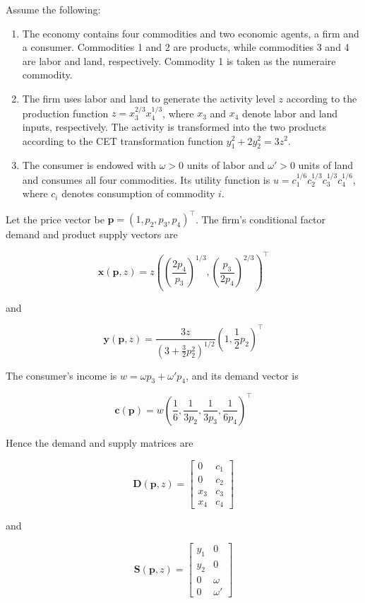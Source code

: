 \documentclass[
  letterpaper,
  DIV=11,
  numbers=noendperiod]{scrreprt}
\begin{document}
Assume the following:

\begin{enumerate}
\def\labelenumi{\arabic{enumi}.}
\item
  The economy contains four commodities and two economic agents, a firm
  and a consumer. Commodities 1 and 2 are products, while commodities 3
  and 4 are labor and land, respectively. Commodity 1 is taken as the
  numeraire commodity.
\item
  The firm uses labor and land to generate the activity level \(z\)
  according to the production function \(z=x_3^{2/3}x_4^{1/3}\), where
  \(x_3\) and \(x_4\) denote labor and land inputs, respectively. The
  activity is transformed into the two products according to the CET
  transformation function \(y_1^2+2y_2^2=3z^2\).
\item
  The consumer is endowed with \(\omega>0\) units of labor and
  \(\omega'>0\) units of land and consumes all four commodities. Its
  utility function is \(u=c_1^{1/6}c_2^{1/3}c_3^{1/3}c_4^{1/6}\), where
  \(c_i\) denotes consumption of commodity \(i\).
\end{enumerate}

Let the price vector be \(\mathbf p=(1,p_2,p_3,p_4)^\top\). The firm's
conditional factor demand and product supply vectors are

\[
\mathbf x(\mathbf p,z)
=
z
\left(
\left(\frac{2p_4}{p_3}\right)^{1/3},
\left(\frac{p_3}{2p_4}\right)^{2/3}
\right)^\top
\]

and

\[
\mathbf y(\mathbf p,z)
=
\frac{3z}{\left(3+\frac32p_2^2\right)^{1/2}}
\left(
1,\frac12p_2
\right)^\top
\]

The consumer's income is \(w=\omega p_3+\omega'p_4\), and its demand
vector is

\[
\mathbf c(\mathbf p)
=
w
\left(
\frac16,
\frac{1}{3p_2},
\frac{1}{3p_3},
\frac{1}{6p_4}
\right)^\top
\]

Hence the demand and supply matrices are

\[
\mathbf D(\mathbf p,z)
=
\begin{bmatrix}
0&c_1\\
0&c_2\\
x_3&c_3\\
x_4&c_4
\end{bmatrix}
\]

and

\[
\mathbf S(\mathbf p,z)
=
\begin{bmatrix}
y_1&0\\
y_2&0\\
0&\omega\\
0&\omega'
\end{bmatrix}
\]
\end{document}
